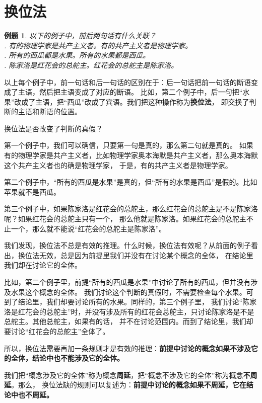 \documentclass[12pt,UTF8]{ctexbook}
\newtheorem{et}{例题}[section]
\begin{document}
\section{换位法}
\begin{et}\label{et:2b-1-0} 
    以下的例子中，前后两句话有什么关联？\\
    . 有的物理学家是共产主义者。有的共产主义者是物理学家。\\
    . 所有的西瓜都是水果。所有的水果都是西瓜。\\
    . 陈家洛是红花会的总舵主。红花会的总舵主是陈家洛。
\end{et}
以上每个例子中，前一句话和后一句话的区别在于：后一句话把前一句话的断语变成了主语，然后把主语变成了对应的断语。
比如，第二个例子中，后一句把“水果”改成了主语，把“西瓜”改成了宾语。我们把这种操作称为\textbf{换位法}，
即交换了判断的主语和断语的位置。

换位法是否改变了判断的真假？

第一个例子中，我们可以确信，只要第一句是真的，那么第二句就是真的。
如果有的物理学家是共产主义者，比如物理学家奥本海默是共产主义者，那么奥本海默这个共产主义者也的确是物理学家，
于是，有的共产主义者是物理学家。

第二个例子中，“所有的西瓜是水果”是真的，但“所有的水果是西瓜”是假的。比如苹果就不是西瓜。

第三个例子中，如果陈家洛是红花会的总舵主，那么红花会的总舵主是不是陈家洛呢？如果红花会的总舵主只有一个，
那么他就是陈家洛。如果红花会的总舵主不止一个，那么就不能说“红花会的总舵主是陈家洛”。

我们发现，换位法不总是有效的推理。什么时候，换位法有效呢？从前面的例子看出，换位法无效，总是因为前提里我们并没有在讨论某个概念的全体，
在结论里我们却在讨论它的全体。

比如，第二个例子里，前提“所有的西瓜是水果”中讨论了所有的西瓜，但并没有涉及水果这个概念的全体。
我们讨论这个判断的真假时，不需要检查每个水果。可到了结论里，我们却要讨论所有的水果。同样的，第三个例子里，
我们讨论“陈家洛是红花会的总舵主”时，并没有涉及所有的红花会总舵主，只讨论陈家洛是不是总舵主。其他总舵主，如果有的话，
并不在讨论范围内。而到了结论里，我们却要讨论“红花会的总舵主”全体了。

所以，换位法需要再加一条规则才是有效的推理：\textbf{前提中讨论的概念如果不涉及它的全体，结论中也不能涉及它的全体。}

我们把“概念涉及它的全体”称为概念\textbf{周延}，把“概念不涉及它的全体”称为概念\textbf{不周延}。那么，
换位法缺的规则可以复述为：\textbf{前提中讨论的概念如果不周延，它在结论中也不周延。}
\end{document}
